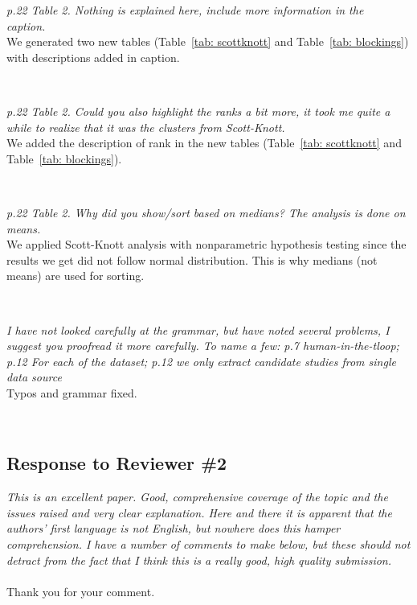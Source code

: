 \documentclass{svjour3}
\theoremstyle{break}
\newcommand{\review}[1]{{\textit{#1}}~\\}
\begin{document}
\review{p.22 Table 2. Nothing is explained here, include more information in the caption.}

We generated two new tables (Table~\ref{tab: scottknott} and Table~\ref{tab: blockings}) with descriptions added in caption.
\par~

\review{p.22 Table 2. Could you also highlight the ranks a bit more, it took me quite a while to realize that it was the clusters from Scott-Knott.}

We added the description of rank in the new tables (Table~\ref{tab: scottknott} and Table~\ref{tab: blockings}).
\par~

\review{p.22 Table 2. Why did you show/sort based on medians? The analysis is done on means.}

We applied Scott-Knott analysis with nonparametric hypothesis testing since the results we get did not follow normal distribution. This is why medians (not means) are used for sorting.
\par~

\review{I have not looked carefully at the grammar, but have noted several problems, I suggest you proofread it more carefully. To name a few: p.7 human-in-the-tloop; p.12 For each of the dataset; p.12 we only extract candidate studies from single data source}

Typos and grammar fixed.
\par~


\subsection*{Response to Reviewer \#2}
\review{This is an excellent paper. Good, comprehensive coverage of the topic and the issues raised and very clear explanation. Here and there it is apparent that the authors' first language is not English, but nowhere does this hamper comprehension. I have a number of comments to make below, but these should not detract from the fact that I think this is a really good, high quality submission.}
\\
Thank you for your comment. 

\par ~

\end{document}
